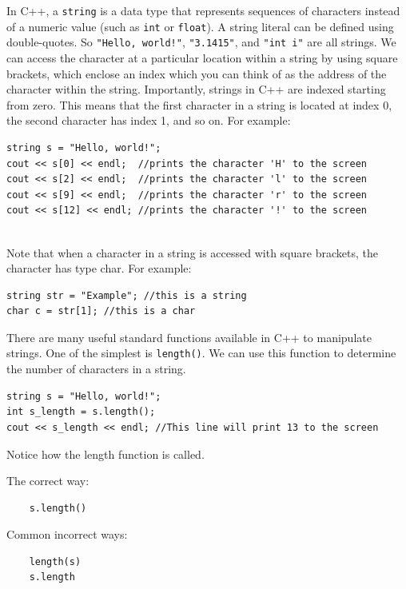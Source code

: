 In C++, a \texttt{string} is a data type that represents sequences of characters instead of a numeric value (such as \texttt{int} or \texttt{float}). A string literal can be defined using double-quotes. So \texttt{"Hello, world!"}, \texttt{"3.1415"}, and \texttt{"int i"} are all strings. We can access the character at a particular location within a string by using square brackets, which enclose an index which you can think of as the address of the character within the string. Importantly, strings in C++ are indexed starting from zero. This means that the first character in a string is located at index 0, the second character has index 1, and so on. For example:

\begin{verbatim}
string s = "Hello, world!";
cout << s[0] << endl;  //prints the character 'H' to the screen
cout << s[2] << endl;  //prints the character 'l' to the screen
cout << s[9] << endl;  //prints the character 'r' to the screen
cout << s[12] << endl; //prints the character '!' to the screen
    
\end{verbatim}

Note that when a character in a string is accessed with square brackets, the character has type char. For example:

\begin{verbatim}
string str = "Example"; //this is a string
char c = str[1]; //this is a char
\end{verbatim}

There are many useful standard functions available in C++ to manipulate strings. One of the simplest is \texttt{length()}. We can use this function to determine the number of characters in a string. 

\begin{verbatim}
string s = "Hello, world!";
int s_length = s.length();
cout << s_length << endl; //This line will print 13 to the screen    
\end{verbatim}

Notice how the length function is called.

The correct way:

\begin{verbatim}
    s.length()
\end{verbatim}

Common incorrect ways:

\begin{verbatim}
    length(s)
    s.length 
\end{verbatim}

